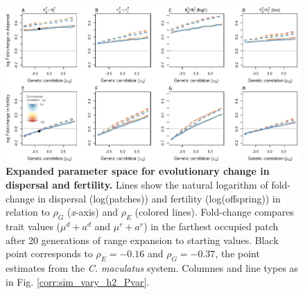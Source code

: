 \documentclass[11pt]{article}
\begin{document}
\begin{figure}[h!]
\centering
\includegraphics[width=1\linewidth]{Figures/trait_change_appendix}
\caption{\textbf{Expanded parameter space for evolutionary change in dispersal and fertility.} Lines show the natural logarithm of fold-change in dispersal (log(patches)) and fertility (log(offspring)) in relation to $\rho_{G}$ (\textit{x}-axis) and $\rho_{E}$ (colored lines).
Fold-change compares trait values ($\mu^{d} + a^{d}$ and $\mu^{r} + a^{r}$) in the farthest occupied patch after 20 generations of range expansion to starting values.
Black point corresponds to $\rho_{E} = -0.16$ and $\rho_{G} = -0.37$, the point estimates from the \textit{C. maculatus} system.
Columnes and line types as in Fig. \ref{corr:sim_vary_h2_Pvar}.}
\label{corr:traits_app}
\end{figure}

\newpage{}




\end{document}
